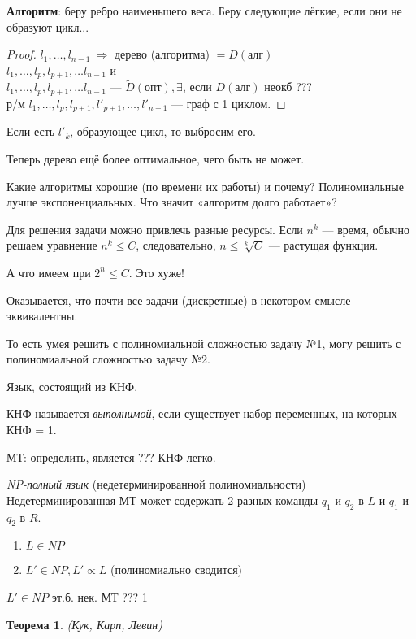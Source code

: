 \documentclass[final]{report}
\newtheorem* {theor} {Теорема}
\theoremstyle {remark}
\theoremstyle {remark}
\begin{document}
\textbf{Алгоритм}: беру ребро наименьшего веса. Беру следующие лёгкие, если они не образуют цикл...
\begin{proof}
	$ l_1, \ldots, l_{n-1}\ \Rightarrow$ дерево (алгоритма)
	$ = D(\text{алг}) $ \\
	$ l_1, \ldots, l_p, l_{p+1}, \ldots l_{n-1} $ и \\
	$ l_1, \ldots, l_p, l_{p+1}, \ldots l_{n-1} $
	— $ \widetilde{D}(\text{опт}), \exists $, если $ D(\text{алг}) $
	неокб ??? \\
	р/м $ l_1, \ldots, l_p, l_{p+1}, l'_{p+1}, \ldots, l'_{n-1} $
	— граф с 1 циклом.
\end{proof}

Если есть $l'_k$, образующее цикл, то выбросим его.

Теперь дерево ещё более оптимальное, чего быть не может.

Какие алгоритмы хорошие (по времени их работы) и почему? Полиномиальные лучше экспоненциальных. Что значит «алгоритм долго работает»?

Для решения задачи можно привлечь разные ресурсы. Если $n^k$ — время, обычно решаем уравнение $n^k \leqslant C$, следовательно, $n \leqslant \sqrt[k]{C}$ — растущая функция.

А что имеем при $ 2^n \leqslant C $. Это хуже!

Оказывается, что почти все задачи (дискретные) в некотором смысле эквивалентны.

То есть умея решить с полиномиальной сложностью задачу №1, могу решить с полиномиальной сложностью задачу №2.

Язык, состоящий из КНФ.

КНФ называется \emph{выполнимой}, если существует набор переменных, на которых КНФ = 1.

МТ: определить, является ??? КНФ легко.

\emph{NP-полный язык} (недетерминированной полиномиальности) Недетерминированная МТ может содержать 2 разных команды
$ q_1 $ и $ q_2 $ в $ L $ и
$ q_1 $ и $ q_2 $ в $ R $.

\begin{enumerate}
\item $ L \in NP $
\item $ L' \in NP, L' \propto L $ (полиномиально сводится)
\end{enumerate}
$ L' \in NP $ эт.б. нек. МТ ??? 1

\begin{theor}
(Кук, Карп, Левин)
\end{theor}
\end{document}
